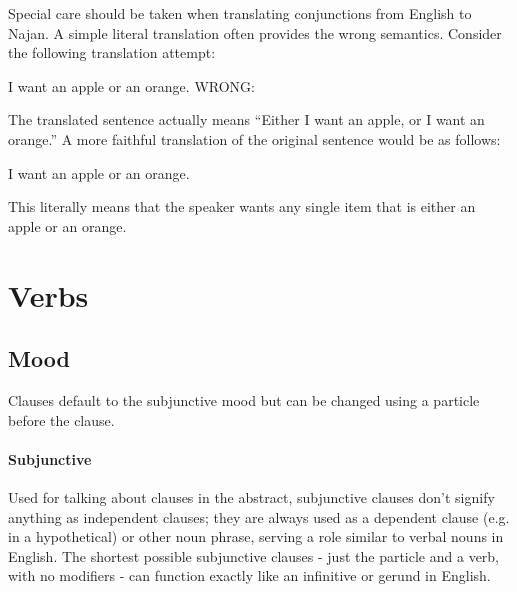 
Special care should be taken when translating conjunctions from English to
Najan. A simple literal translation often provides the wrong semantics. Consider
the following translation attempt:

{I want an apple or an orange.}
{WRONG: }

The translated sentence actually means ``Either I want an apple, or I want an
orange.'' A more faithful translation of the original sentence would be as
follows:

{I want an apple or an orange.}
{}

This literally means that the speaker wants any single item that is either an
apple or an orange.

\section{Verbs} \label{sec:verbs}

\subsection{Mood} \label{sec:mood}

Clauses default to the subjunctive mood but can be changed using a particle
before the clause.

\paragraph{Subjunctive} Used for talking about clauses in the abstract,
subjunctive clauses don't signify anything as independent clauses; they are
always used as a dependent clause (e.g. in a hypothetical) or other noun phrase,
serving a role similar to verbal nouns in English. The shortest possible
subjunctive clauses - just the particle and a verb, with no modifiers - can
function exactly like an infinitive or gerund in English.

